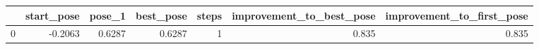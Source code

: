 \begin{tabular}{lrrrrrr}
\toprule
{} &  start\_pose &  pose\_1 &  best\_pose &  steps &  improvement\_to\_best\_pose &  improvement\_to\_first\_pose \\
\midrule
0 &     -0.2063 &  0.6287 &     0.6287 &      1 &                     0.835 &                      0.835 \\
\bottomrule
\end{tabular}
